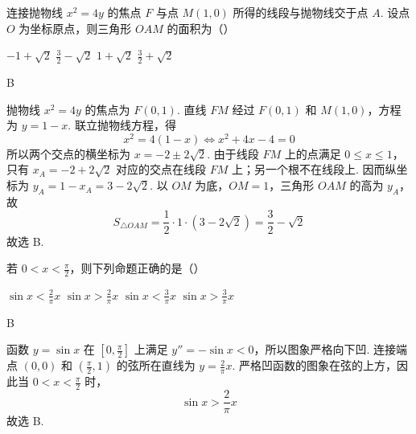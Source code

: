 \begin{problem}
连接抛物线 \(x^{2} = 4y\) 的焦点 \(F\) 与点 \(M(1,0)\) 所得的线段与抛物线交于点 \(A\). 设点 \(O\) 为坐标原点，则三角形 \(OAM\) 的面积为（\quad）

\choices
    {\(-1 + \sqrt{2}\)}
    {\(\frac{3}{2} -\sqrt{2}\)}
    {\(1 + \sqrt{2}\)}
    {\(\frac{3}{2} +\sqrt{2}\)}

\begin{answer}
B
\end{answer}

\begin{solution}
抛物线 \(x^2=4y\) 的焦点为 \(F(0,1)\). 直线 \(FM\) 经过 \(F(0,1)\) 和 \(M(1,0)\)，方程为 \(y=1-x\). 联立抛物线方程，得
\[
x^2=4(1-x)\Longleftrightarrow x^2+4x-4=0
\]
所以两个交点的横坐标为 \(x=-2\pm2\sqrt{2}\). 由于线段 \(FM\) 上的点满足 \(0\leqslant x\leqslant1\)，只有
\(x_A=-2+2\sqrt{2}\) 对应的交点在线段 \(FM\) 上；另一个根不在线段上. 因而纵坐标为
\(y_A=1-x_A=3-2\sqrt{2}\). 以 \(OM\) 为底，\(OM=1\)，三角形 \(OAM\) 的高为 \(y_A\)，故
\[
S_{\triangle OAM}=\frac{1}{2}\cdot1\cdot(3-2\sqrt{2})=\frac{3}{2}-\sqrt{2}
\]
故选 B.
\end{solution}
\end{problem}

\begin{problem}
若 \(0 < x < \frac{\pi}{2}\)，则下列命题正确的是（\quad）

\choices
    {\(\sin x < \frac{2}{\pi}x\)}
    {\(\sin x > \frac{2}{\pi}x\)}
    {\(\sin x < \frac{3}{\pi}x\)}
    {\(\sin x > \frac{3}{\pi}x\)}

\begin{answer}
B
\end{answer}

\begin{solution}
函数 \(y=\sin x\) 在 \(\left[0,\frac{\pi}{2}\right]\) 上满足
\(y''=-\sin x<0\)，所以图象严格向下凹. 连接端点 \(\left(0,0\right)\) 和 \(\left(\frac{\pi}{2},1\right)\) 的弦所在直线为
\(y=\frac{2}{\pi}x\). 严格凹函数的图象在弦的上方，因此当 \(0<x<\frac{\pi}{2}\) 时，
\[
\sin x>\frac{2}{\pi}x
\]
故选 B.
\end{solution}
\end{problem}

